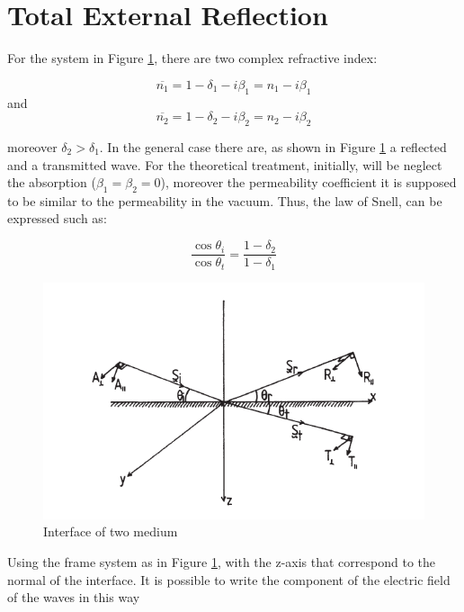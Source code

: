 \section{Total External Reflection}
\label{sec: Total Externa Reflection}
\begin{flushleft}
For the system in Figure \ref{fig: System}, there are two complex refractive index:
\end{flushleft}
\begin{equation}
\overline{n_1} = 1 - \delta_1 - i \beta_1 = n_1 - i \beta_1
\label{eq: n1}
\end{equation}
and
\begin{equation}
\overline{n_2} = 1 - \delta_2 - i \beta_2 = n_2 - i \beta_2
\label{eq: n1}
\end{equation}
\begin{flushleft}
moreover $\delta_2 > \delta_1 $. In the general case there are, as shown in Figure \ref{fig: System} a reflected and a transmitted wave. For the theoretical treatment, initially, will be neglect the absorption ($\beta_1 = \beta_2 = 0$), moreover the permeability coefficient it is supposed to be similar to the permeability in the vacuum. Thus, the law of Snell, can be expressed such as: 
\end{flushleft}
\begin{equation}
\frac{\cos \theta_i}{\cos \theta_t} = \frac{1 - \delta_2}{1 - \delta_1}
\label{eq: snell 1}
\end{equation}
\begin{figure}[]
%
\centering
%
\includegraphics[width=.6\textwidth]{Immagini/Chapter1/System}
%
\caption{Interface of two medium}
%
\label{fig: System}
%
\end{figure}
\begin{flushleft}
Using the frame system as in Figure \ref{fig: System}, with the z-axis that correspond to the normal of the interface. It is possible to write the component of the electric field of the waves in this way
\end{flushleft}
